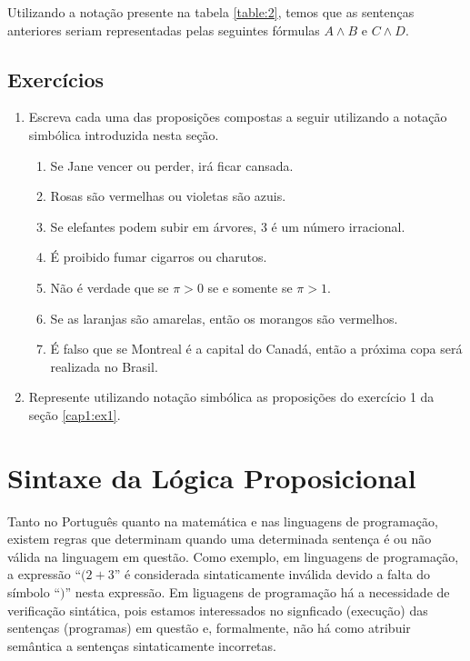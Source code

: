 Utilizando a nota\c{c}\~ao presente na tabela \ref{table:2}, temos que as senten\c{c}as anteriores seriam representadas pelas seguintes f\'ormulas
$A \land B$  e $C \land D$.

\subsection{Exerc\'icios}

\begin{enumerate}
  \item Escreva cada uma das proposi\c{c}\~oes compostas a seguir utilizando a nota\c{c}\~ao simb\'olica introduzida nesta se\c{c}\~ao.
  \begin{enumerate}
    \item Se Jane vencer ou perder, ir\'a ficar cansada.
    \item Rosas s\~ao vermelhas ou violetas s\~ao azuis.
    \item Se elefantes podem subir em \'arvores, 3 \'e um n\'umero irracional.
    \item \'E proibido fumar cigarros ou charutos.
    \item N\~ao \'e verdade que se $\pi > 0$ se e somente se $\pi > 1$.
    \item Se as laranjas s\~ao amarelas, ent\~ao os morangos s\~ao vermelhos.
    \item \'E falso que se Montreal \'e a capital do Canad\'a, ent\~ao a pr\'oxima copa ser\'a realizada no Brasil.
  \end{enumerate}
  \item Represente utilizando nota\c{c}\~ao simb\'olica as proposi\c{c}\~oes do exerc\'icio 1 da se\c{c}\~ao \ref{cap1:ex1}.
\end{enumerate}

\section{Sintaxe da L\'ogica Proposicional}

Tanto no Portugu\^es quanto na matem\'atica e nas linguagens de programa\c{c}\~ao, existem regras que determinam quando uma determinada
senten\c{c}a \'e ou n\~ao v\'alida na linguagem em quest\~ao. Como exemplo, em linguagens de programa\c{c}\~ao, a express\~ao ``$(2 + 3$'' \'e
considerada sintaticamente inv\'alida devido a falta do s\'imbolo ``$)$'' nesta express\~ao. Em liguagens de programa\c{c}\~ao h\'a a necessidade
de verifica\c{c}\~ao sint\'atica, pois estamos interessados no signficado (execu\c{c}\~ao) das senten\c{c}as (programas) em quest\~ao e,
formalmente, n\~ao h\'a como atribuir sem\^antica a senten\c{c}as sintaticamente incorretas.

